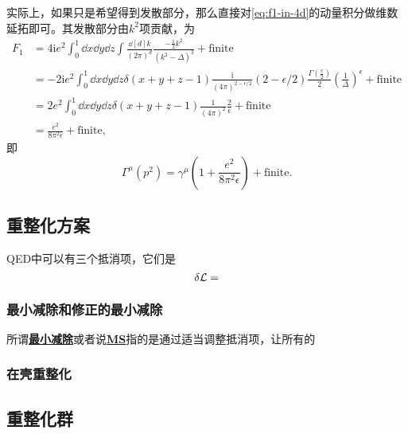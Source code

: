 \documentclass[hyperref, UTF8, a4paper]{ctexart}
\newcommand*{\ii}{\mathrm{i}}
\newcommand{\concept}[1]{\underline{\textbf{#1}}}
\begin{document}
实际上，如果只是希望得到发散部分，那么直接对\eqref{eq:f1-in-4d}的动量积分做维数延拓即可。其发散部分由$k^2$项贡献，为
\[
    \begin{aligned}
        F_1 &= 4 \ii e^2 \int_0^1 \dd{x} \dd{y} \dd{z} \int \frac{\dd[d]{k}}{(2\pi)^d} \frac{-\frac{1}{2} k^2}{(k^2 - \Delta)^3} + \text{finite} \\
        &= - 2 \ii e^2 \int_0^1 \dd{x} \dd{y} \dd{z} \delta(x + y + z - 1) \frac{\ii}{(4\pi)^{2 - \epsilon / 2}} (2 - \epsilon / 2) \frac{\Gamma\left(\frac{\epsilon}{2}\right)}{2} \left(\frac{1}{\Delta}\right)^{\epsilon} + \text{finite} \\
        &= 2 e^2 \int_0^1 \dd{x} \dd{y} \dd{z} \delta(x + y + z - 1) \frac{1}{(4\pi)^2} \frac{2}{\epsilon} + \text{finite} \\
        &= \frac{e^2}{8\pi^2 \epsilon} + \text{finite}, 
    \end{aligned}
\]
即
\begin{equation}
    \Gamma^\mu(p^2) = \gamma^\mu \left( 1 + \frac{e^2}{8\pi^2 \epsilon} \right) + \text{finite}.
\end{equation}

\subsection{重整化方案}

QED中可以有三个抵消项，它们是
\begin{equation}
    \var{\mathcal{L}} = 
\end{equation}

\subsubsection{最小减除和修正的最小减除}

所谓\concept{最小减除}或者说\concept{MS}指的是通过适当调整抵消项，让所有的

\subsubsection{在壳重整化}

\subsection{重整化群}
\end{document}
